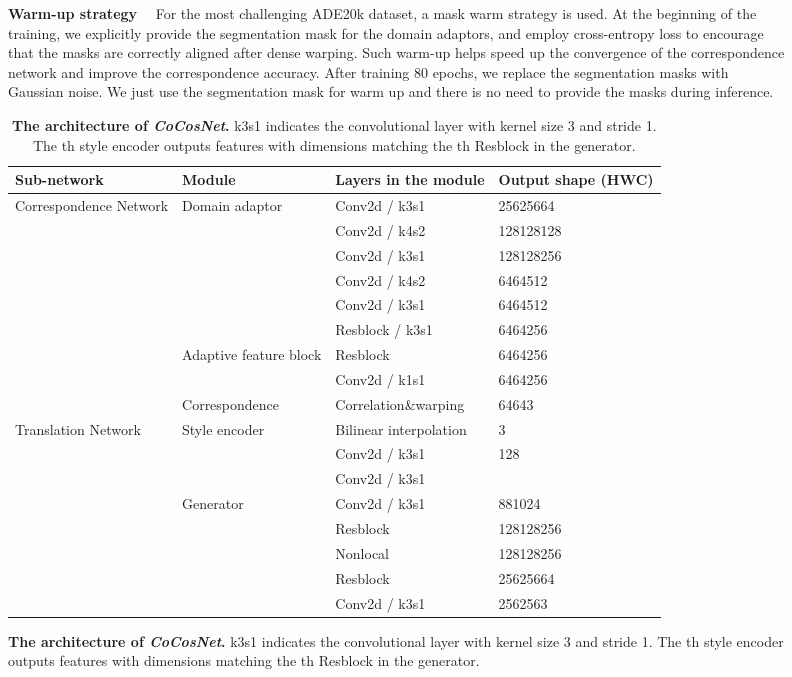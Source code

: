 \documentclass[10pt,twocolumn,letterpaper]{article}
\begin{document}
\begin{figure}[!t]
\noindent\textbf{Warm-up strategy}~~
For the most challenging ADE20k dataset, a mask warm strategy is used. At the beginning of the training, we explicitly provide the segmentation mask for the domain adaptors, and employ cross-entropy loss to encourage that the masks are correctly aligned after dense warping. Such warm-up helps speed up the convergence of the correspondence network and improve the correspondence accuracy. 
After training 80 epochs, we replace the segmentation masks with Gaussian noise. We just use the segmentation mask for warm up and there is no need to provide the masks during inference.

\begin{table}[!tbh]
  \small
  \begin{center}
    \caption{\textbf{The architecture of \emph{CoCosNet}.} k3s1 indicates the convolutional layer with kernel size 3 and stride 1. The th style encoder outputs features with dimensions matching the th Resblock in the generator.}
    \label{tab:architecture of CoCosNet}
    \begin{tabular}{@{}l|l|l|l@{}}
      \toprule
      {Sub-network} & {Module} & {Layers in the module} & {Output shape (HWC)}\\
      \midrule
      \multirow{7}{2.5cm}{Correspondence Network} 
      & \multirow{6}{3.0cm}{Domain adaptor} & Conv2d / k3s1 & 25625664\\ 
      & & Conv2d / k4s2 & 128128128\\
      & & Conv2d / k3s1 & 128128256\\
      & & Conv2d / k4s2 & 6464512\\
      & & Conv2d / k3s1 & 6464512\\
      & & Resblock / k3s1 & 6464256\\
      \cmidrule{2-4}
      & \multirow{2}{3.0cm}{Adaptive feature block} & Resblock & 6464256\\
      & & Conv2d / k1s1 & 6464256\\
      \cmidrule{2-4}
      &Correspondence&Correlation\&warping & 64643\\
      \midrule
      \multirow{7}{2.5cm}{Translation Network}
      & \multirow{3}{3.0cm}{Style encoder} & Bilinear interpolation & 3\\ 
      & & Conv2d / k3s1 & 128\\
      & & Conv2d / k3s1 & \\
      \cmidrule{2-4}
      & \multirow{5}{3.0cm}{Generator} & Conv2d / k3s1 & 881024\\ 
      &  & Resblock & 128128256\\
      &  & Nonlocal & 128128256\\
      &  & Resblock & 25625664\\
      &  & Conv2d / k3s1 & 2562563\\
      \bottomrule
    \end{tabular}
  \end{center}
\end{table}


\end{figure}
\end{document}
